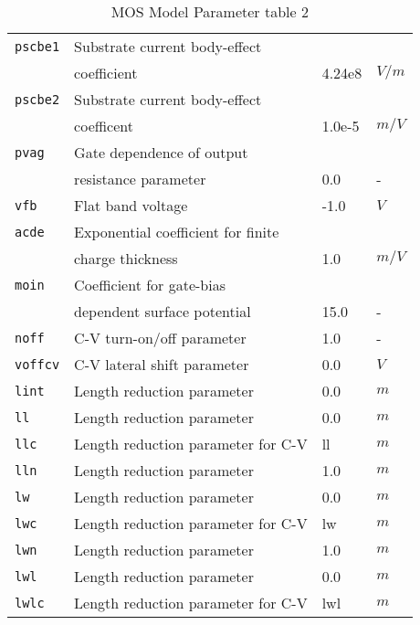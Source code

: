 \documentclass{article}
\begin{document}
\begin{table}[H]
\begin{tabular}{|l| l| l| l|}
\texttt{pscbe1} & Substrate current body-effect & & \\
                & coefficient & 4.24e8 & $V/m$\\
\texttt{pscbe2} & Substrate current body-effect & & \\
                & coefficent & 1.0e-5 & $m/V$\\
\texttt{pvag} & Gate dependence of output & & \\
              & resistance parameter & 0.0 & - \\
\texttt{vfb} & Flat band voltage & -1.0 & $V$ \\
\texttt{acde} & Exponential coefficient for finite & & \\
              & charge thickness & 1.0 & $m/V$\\
\texttt{moin} & Coefficient for gate-bias & & \\
              & dependent surface potential & 15.0 & - \\
\texttt{noff} & C-V turn-on/off parameter & 1.0 & -\\
\texttt{voffcv} & C-V lateral shift parameter & 0.0 & $V$\\
\texttt{lint} & Length reduction parameter & 0.0 & $m$\\
\texttt{ll} & Length reduction parameter & 0.0 & $m$\\
\texttt{llc} & Length reduction parameter for C-V & ll & $m$\\
\texttt{lln} & Length reduction parameter & 1.0 & $m$\\
\texttt{lw} & Length reduction parameter & 0.0 & $m$\\
\texttt{lwc} & Length reduction parameter for C-V & lw & $m$\\
\texttt{lwn} & Length reduction parameter & 1.0 & $m$\\
\texttt{lwl} & Length reduction parameter & 0.0 & $m$\\
\texttt{lwlc} & Length reduction parameter for C-V & lwl & $m$\\
\hline
\end{tabular}
\caption{\label{bsim3.params2} MOS Model Parameter table 2}
\end{table}
\end{document}

